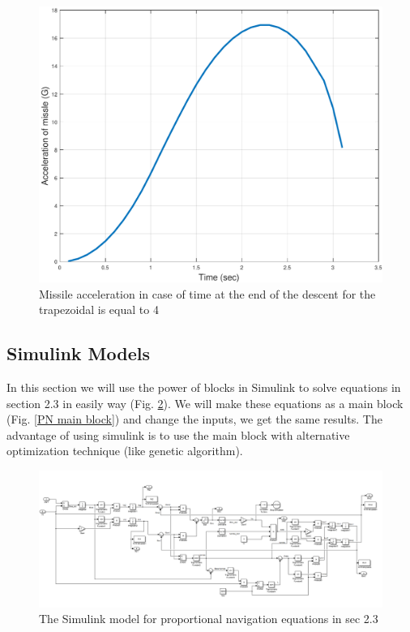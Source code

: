 \begin{figure}[htb]
	\centering
	\includegraphics[scale = 0.75]{fig/MissileAccelerationT3.pdf}
	\caption{Missile acceleration in case of time at the end of the descent for the trapezoidal is equal to 4 }
	\label{missile accelerationT3}
\end{figure}

\subsection{Simulink Models}

In this section we will use the power of blocks in Simulink to solve equations in section 2.3 in easily way (Fig. \ref{PN eq}). We will make these equations as a main block (Fig. \ref{PN main block}) and change the inputs, we get the same results. The advantage of using simulink is to use the main block with alternative optimization technique (like genetic algorithm). 


\begin{figure}[htb]
	\centering
	\includegraphics[scale = 0.75]{fig/PNeq.PNG}
	\caption{The Simulink model for proportional navigation equations in sec 2.3}
	\label{PN eq}
\end{figure}


